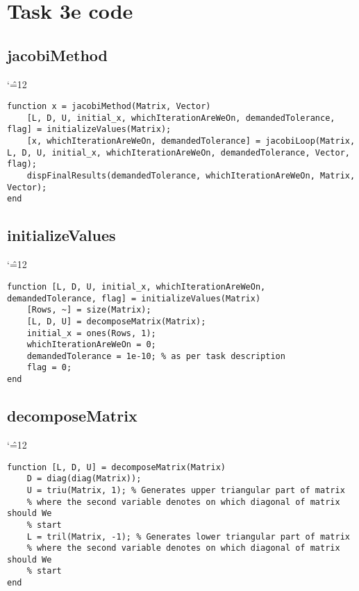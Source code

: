 \documentclass{report}
\newenvironment{simplechar}{%
   \catcode`\^=12
}{}
\begin{document}
\section{Task 3e code}
\subsection{jacobiMethod}
\begin{simplechar}
\begin{lstlisting}
function x = jacobiMethod(Matrix, Vector)
    [L, D, U, initial_x, whichIterationAreWeOn, demandedTolerance, flag] = initializeValues(Matrix);
    [x, whichIterationAreWeOn, demandedTolerance] = jacobiLoop(Matrix, L, D, U, initial_x, whichIterationAreWeOn, demandedTolerance, Vector, flag);
    dispFinalResults(demandedTolerance, whichIterationAreWeOn, Matrix, Vector);
end
\end{lstlisting}
\end{simplechar}

\subsection{initializeValues}
\begin{simplechar}
\begin{lstlisting}
function [L, D, U, initial_x, whichIterationAreWeOn, demandedTolerance, flag] = initializeValues(Matrix)
    [Rows, ~] = size(Matrix);
    [L, D, U] = decomposeMatrix(Matrix);
    initial_x = ones(Rows, 1);
    whichIterationAreWeOn = 0;
    demandedTolerance = 1e-10; % as per task description
    flag = 0;
end
\end{lstlisting}
\end{simplechar}

\subsection{decomposeMatrix}
\begin{simplechar}
\begin{lstlisting}
function [L, D, U] = decomposeMatrix(Matrix)
    D = diag(diag(Matrix));
    U = triu(Matrix, 1); % Generates upper triangular part of matrix
    % where the second variable denotes on which diagonal of matrix should We
    % start
    L = tril(Matrix, -1); % Generates lower triangular part of matrix
    % where the second variable denotes on which diagonal of matrix should We
    % start
end
\end{lstlisting}
\end{simplechar}
\end{document}
